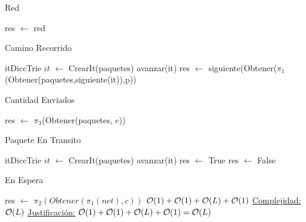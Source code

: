 \begin{Algoritmos}
\begin{algorithm}
\begin{algorithmic}[1]
 \EndProcedure
\end{algorithmic}
\end{algorithm}



\begin{algorithm}
\caption{Red}
\begin{algorithmic}[1]
 \State res $\gets$ red
 \EndProcedure
\end{algorithmic}
\end{algorithm}

\begin{algorithm}
\caption{Camino Recorrido}
\begin{algorithmic}[1]
   \State itDiccTrie $it$ $\gets$ CrearIt(paquetes)
   \State avanzar(it)
   \EndWhile
   \State res $\gets$ siguiente(Obtener($\pi_1$(Obtener(paquetes,siguiente(it)),p))
  \EndProcedure
\end{algorithmic}
\end{algorithm}


\begin{algorithm}
\caption{Cantidad Enviados}
\begin{algorithmic}[1]
   \State res $\gets$ $\pi_3$(Obtener(paquetes, c))
  \EndProcedure
\end{algorithmic}
\end{algorithm}


\begin{algorithm}
\caption{Paquete En Transito}
\begin{algorithmic}[1]
   \State itDiccTrie $it$ $\gets$ CrearIt(paquetes)
   \State avanzar(it)
	\EndWhile
	\State res $\gets$   True
	\Else 
	\State res $\gets$ False
	\EndIf 
  \EndProcedure
\end{algorithmic}
\end{algorithm}




\begin{algorithm}
\caption{En Espera}
\begin{algorithmic}[1]
    \State res $\gets$ $\pi_2(Obtener(\pi_1(net),c))$ \Comment $\mathcal{O}(1)+\mathcal{O}(1)+\mathcal{O}(L)+\mathcal{O}(1)$
  \EndProcedure
  \underline{Complejidad:} $\mathcal{O}(L)$
 \underline{Justificación:} $\mathcal{O}(1)+\mathcal{O}(1)+\mathcal{O}(L)+\mathcal{O}(1) = \mathcal{O}(L)$


\end{algorithmic}
\end{algorithm}
\end{Algoritmos}
